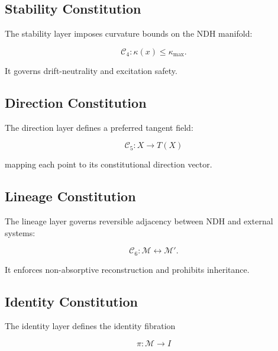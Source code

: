 \subsection{Stability Constitution}

The stability layer imposes curvature bounds on the NDH manifold:

\[
\mathcal{C}_4 : \kappa(x) \le \kappa_{\max}.
\]

It governs drift-neutrality and excitation safety.


\subsection{Direction Constitution}

The direction layer defines a preferred tangent field:

\[
\mathcal{C}_5 : X \to T(X)
\]

mapping each point to its constitutional direction vector.


\subsection{Lineage Constitution}

The lineage layer governs reversible adjacency between NDH and external
systems:

\[
\mathcal{C}_6 : \mathcal{M} \leftrightarrow \mathcal{M}'.
\]

It enforces non-absorptive reconstruction and prohibits inheritance.


\subsection{Identity Constitution}

The identity layer defines the identity fibration

\[
\pi : \mathcal{M} \to I
\]


